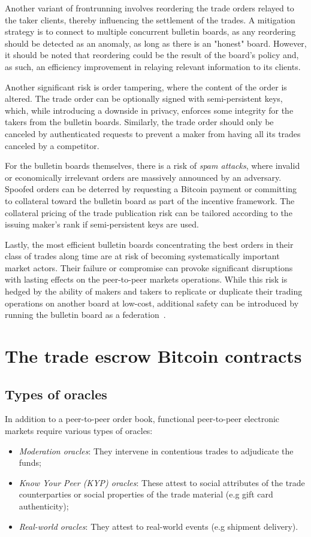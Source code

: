 \documentclass[pdflatex,sn-mathphys]{sn-jnl}%
\theoremstyle{thmstyleone}%
\theoremstyle{thmstyletwo}%
\theoremstyle{thmstylethree}%
\begin{document}
Another variant of frontrunning involves reordering the trade orders relayed to the taker clients, thereby influencing the settlement of the trades. A mitigation strategy is to connect to multiple concurrent bulletin boards, as any reordering should be detected as an anomaly, as long as there is an "honest" board. However, it should be noted that reordering could be the result of the board's policy and, as such, an efficiency improvement in relaying relevant information to its clients.

Another significant risk is order tampering, where the content of the order is altered. The trade order can be optionally signed with semi-persistent keys, which, while introducing a downside in privacy, enforces some integrity for the takers from the bulletin boards. Similarly, the trade order should only be canceled by authenticated requests to prevent a maker from having all its trades canceled by a competitor.

For the bulletin boards themselves, there is a risk of \textit{spam attacks}, where invalid or economically irrelevant orders are massively announced by an adversary. Spoofed orders can be deterred by requesting a Bitcoin payment or committing to collateral toward the bulletin board as part of the incentive framework. The collateral pricing of the trade publication risk can be tailored according to the issuing maker's rank if semi-persistent keys are used.

Lastly, the most efficient bulletin boards concentrating the best orders in their class of trades along time are at risk of becoming systematically important market actors. Their failure or compromise can provoke significant disruptions with lasting effects on the peer-to-peer markets operations. While this risk is hedged by the ability of makers and takers to replicate or duplicate their trading operations on another board at low-cost, additional safety can be introduced by running the bulletin board as a federation~\cite{Fedimint2023Fedidevs}.

\section{The trade escrow Bitcoin contracts}

\subsection{Types of oracles}

In addition to a peer-to-peer order book, functional peer-to-peer electronic markets require various types of oracles:
\begin{itemize}
    \item \textit{Moderation oracles}: They intervene in contentious trades to adjudicate the funds;
    \item \textit{Know Your Peer (KYP) oracles}: These attest to social attributes of the trade counterparties or social properties of the trade material (e.g gift card authenticity);
    \item \textit{Real-world oracles}: They attest to real-world events (e.g shipment delivery).
\end{itemize}
\end{document}
